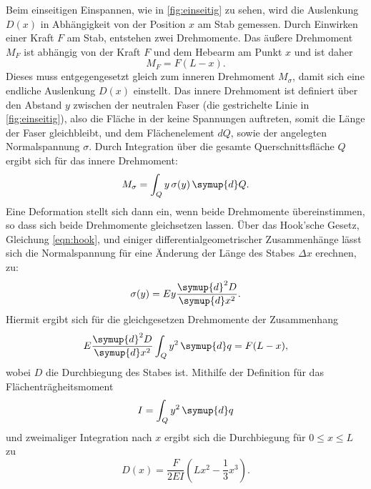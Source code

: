        Beim einseitigen Einspannen, wie in \autoref{fig:einseitig} zu sehen, wird die Auslenkung $D(x)$ in Abhängigkeit von der Position $x$ am Stab gemessen.
        Durch Einwirken einer Kraft $F$ am Stab, entstehen zwei Drehmomente. Das äußere Drehmoment $M_F$ ist abhängig von der Kraft $F$ und dem Hebearm am Punkt $x$ und 
        ist daher 
        \begin{equation}
        \label{eqn:drehmomentA}
            M_F = F (L-x).
        \end{equation}
        Dieses muss entgegengesetzt gleich zum inneren Drehmoment $M_\sigma$, damit sich eine endliche Auslenkung $D(x)$ einstellt.
        Das innere Drehmoment ist definiert über den Abstand $y$ zwischen der neutralen Faser (die gestrichelte Linie in \autoref{fig:einseitig}), also die Fläche in der keine Spannungen
        auftreten, somit die Länge der Faser gleichbleibt, und dem Flächenelement $dQ$, sowie der angelegten Normalspannung $\sigma$. Durch Integration über die gesamte
        Querschnittsfläche $Q$ ergibt sich für das innere Drehmoment:
        \begin{equation}
        \label{eqn:drehmomentI} 
            M_\sigma = \int_Q y \, \sigma (y) \, \symup{d}Q.
        \end{equation}
        Eine Deformation stellt sich dann ein, wenn beide Drehmomente übereinstimmen, so dass sich beide Drehmomente gleichsetzen lassen.
        Über das Hook'sche Gesetz, Gleichung \eqref{eqn:hook}, und einiger differentialgeometrischer Zusammenhänge
        lässt sich die Normalspannung für eine Änderung der Länge des Stabes $\Delta x$ erechnen, zu:
        \begin{equation}
        \label{eqn:Normalspannung}
            \sigma(y) = E y \frac{\symup{d}^2 D}{\symup{d}x^2}.
        \end{equation}
        Hiermit ergibt sich für die gleichgesetzen Drehmomente der Zusammenhang
        \begin{equation}
        \label{eqn:gleichsetzung}
            E \frac{\symup{d}^2 D}{\symup{d}x^2} \int_Q y^2 \, \symup{d}q = F(L - x),
        \end{equation}
        wobei $D$ die Durchbiegung des Stabes ist.
        Mithilfe der Definition für das Flächenträgheitsmoment
        \begin{equation}
        \label{eqn:flaechentraegheitsmoment}
            I = \int_Q y^2 \, \symup{d}q
        \end{equation}
        und zweimaliger Integration nach $x$ ergibt sich die Durchbiegung für $0 \leq x \leq L$ zu
        \begin{equation}
        \label{eqn:durchbiegung1}
            D(x) = \frac{F}{2 E I} (L x^2 - \frac{1}{3} x^3).
        \end{equation}

